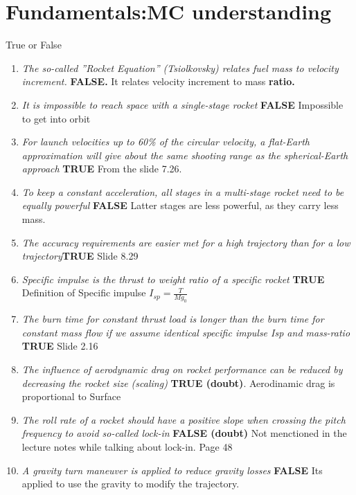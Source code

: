 \section{ Fundamentals:MC understanding }\label{sec:q1}    

True or False

\begin{enumerate}
	\item \textit{The so-called ”Rocket Equation” (Tsiolkovsky) relates fuel mass to velocity increment.}  \textbf{FALSE.} It relates velocity increment to mass \textbf{ratio.}
	\item \textit{It is impossible to reach space with a single-stage rocket} \textbf{FALSE} Impossible to get into orbit
	\item \textit{For launch velocities up to 60\% of the circular velocity, a flat-Earth approximation will
	give about the same shooting range as the spherical-Earth approach} \textbf{TRUE} From the slide 7.26.
	\item \textit{To keep a constant acceleration, all stages in a multi-stage rocket need to be equally
	powerful} \textbf{FALSE} Latter stages are less powerful, as they carry less mass. 
	\item \textit{The accuracy requirements are easier met for a high trajectory than for a low trajectory}\textbf{TRUE} Slide 8.29
	\item \textit{Specific impulse is the thrust to weight ratio of a specific rocket} \textbf{TRUE} Definition of Specific impulse $I_{sp} = \frac{T}{Mg_0}$
	\item \textit{The burn time for constant thrust load is longer than the burn time for constant mass 
	flow if we assume identical specific impulse Isp and mass-ratio} \textbf{TRUE} Slide 2.16
	\item \textit{The influence of aerodynamic drag on rocket performance can be reduced by decreasing
	the rocket size (scaling)} \textbf{TRUE (doubt)}. Aerodinamic drag is proportional to Surface
	\item\textit{ The roll rate of a rocket should have a positive slope when crossing the pitch frequency
	to avoid so-called lock-in } \textbf{FALSE (doubt)} Not menctioned in the lecture notes while talking about lock-in. Page 48 
	\item \textit{A gravity turn maneuver is applied to reduce gravity losses} \textbf{FALSE} Its applied to use the gravity to modify the trajectory.
\end{enumerate}
